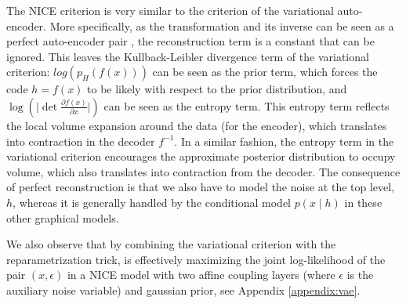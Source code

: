 \documentclass{article}
\begin{document}
The NICE criterion is very similar to the criterion of the variational auto-encoder.
More specifically, as the transformation and its
inverse can be seen as a perfect auto-encoder pair \citep{Bengio-arxiv2014},
the reconstruction term is a constant that can be ignored.
This leaves the Kullback-Leibler divergence term of the variational
criterion: $log(p_H(f(x)))$ can be seen as the prior term, which forces the
code $h=f(x)$ to be likely with respect to the prior distribution, and
$\log(\lvert \det \frac{\partial f(x)}{\partial x} \rvert)$ can be seen as
the entropy term. This entropy term reflects the local volume expansion around
the data (for the encoder), which translates into contraction in the decoder $f^{-1}$. In a
similar fashion, the entropy term in the variational criterion encourages
the approximate posterior distribution to occupy volume, which also translates
into contraction from the decoder.
The consequence of perfect reconstruction is
that we also have to model the noise at the top level, $h$, whereas it is generally handled by the
conditional model $p(x \mid h)$ in these other graphical models.

We also observe that by combining the variational criterion with
the reparametrization trick, \citep{Kingma+Welling-ICLR2014} is
effectively maximizing the joint log-likelihood of the pair $(x, \epsilon)$ in a NICE model
with two affine coupling layers (where $\epsilon$ is the auxiliary noise variable) and gaussian prior, see Appendix \ref{appendix:vae}.
\end{document}
